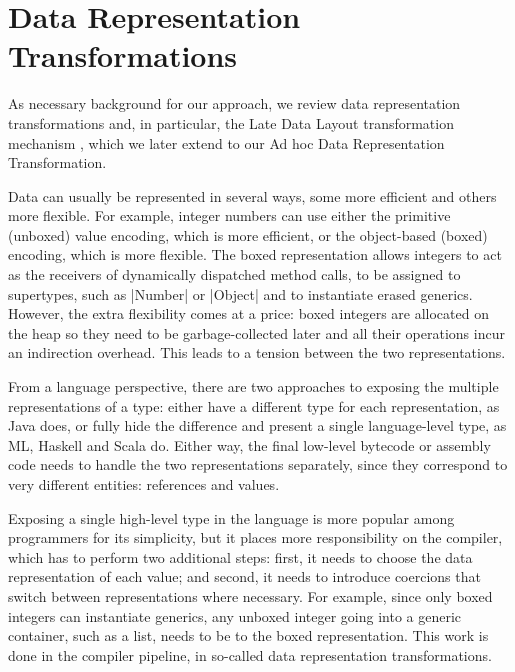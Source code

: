 \vspace{-0.8em}

\section{Data Representation Transformations}
\label{sec:drt}

As necessary background for our approach, we review data representation transformations and, in particular, the Late Data Layout transformation mechanism \cite{ldl}, which we later extend to our Ad hoc Data Representation Transformation.

Data can usually be represented in several ways, some more efficient and others more flexible. For example, integer numbers can use either the primitive (unboxed) value encoding, which is more efficient, or the object-based (boxed) encoding, which is more flexible. The boxed representation allows integers to act as the receivers of dynamically dispatched method calls, to be assigned to supertypes, such as |Number| or |Object| and to instantiate erased generics. However, the extra flexibility comes at a price: boxed integers are allocated on the heap so they need to be garbage-collected later and all their operations incur an indirection overhead. This leads to a tension between the two representations.

From a language perspective, there are two approaches to exposing the multiple representations of a type: either have a different
type for each representation, as Java does, or fully hide the difference and present a single language-level type, as ML, Haskell and Scala do. Either way, the final low-level bytecode or assembly code needs to handle the two representations separately, since they correspond to very different entities: references and values.

Exposing a single high-level type in the language is more popular among programmers for its simplicity, but it places more responsibility on the compiler, which has to perform two additional steps: first, it needs to choose the data representation of each value; and second, it needs to introduce coercions that switch between representations where necessary. For example, since only boxed integers can instantiate generics, any unboxed integer going into a generic container, such as a list, needs to be  to the boxed representation. This work is done in the compiler pipeline, in so-called data representation transformations.


